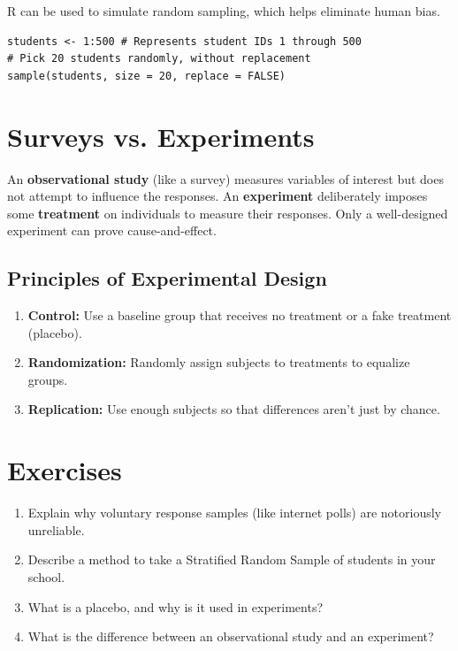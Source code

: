 \documentclass[11pt,openany]{book}
\begin{document}
\begin{rstudio}
R can be used to simulate random sampling, which helps eliminate human bias.
\begin{lstlisting}[style=rcode]
students <- 1:500 # Represents student IDs 1 through 500
# Pick 20 students randomly, without replacement
sample(students, size = 20, replace = FALSE)
\end{lstlisting}
\end{rstudio}

\section{Surveys vs. Experiments}
An \textbf{observational study} (like a survey) measures variables of interest but does not attempt to influence the responses. An \textbf{experiment} deliberately imposes some \textbf{treatment} on individuals to measure their responses. Only a well-designed experiment can prove cause-and-effect.

\subsection{Principles of Experimental Design}
\begin{enumerate}
    \item \textbf{Control:} Use a baseline group that receives no treatment or a fake treatment (placebo).
    \item \textbf{Randomization:} Randomly assign subjects to treatments to equalize groups.
    \item \textbf{Replication:} Use enough subjects so that differences aren't just by chance.
\end{enumerate}

\section{Exercises}
\begin{enumerate}
    \item Explain why voluntary response samples (like internet polls) are notoriously unreliable.
    \item Describe a method to take a Stratified Random Sample of students in your school.
    \item What is a placebo, and why is it used in experiments?
    \item What is the difference between an observational study and an experiment?
\end{enumerate}
\end{document}
